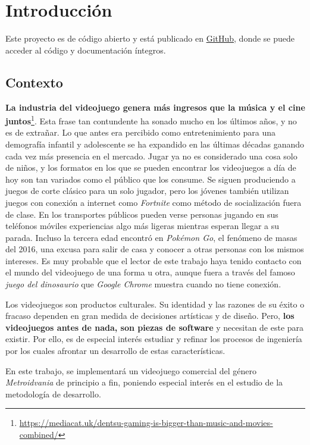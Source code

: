 \chapter{Introducción}

Este proyecto es de código abierto y está publicado en \href{https://github.com/pabloMillanCb/tfm}{GitHub}, donde se puede acceder al código y documentación íntegros.

\section{Contexto}

\textbf{La industria del videojuego genera más ingresos que la música y el cine juntos}\footnote{\url{https://mediacat.uk/dentsu-gaming-is-bigger-than-music-and-movies-combined/}}. Esta frase tan contundente ha sonado mucho en los últimos años, y no es de extrañar. Lo que antes era percibido como entretenimiento para una demografía infantil y adolescente se ha expandido en las últimas décadas ganando cada vez más presencia en el mercado. Jugar ya no es considerado una cosa solo de niños, y los formatos en los que se pueden encontrar los videojuegos a día de hoy son tan variados como el público que los consume. Se siguen produciendo a juegos de corte clásico para un solo jugador, pero los jóvenes también utilizan juegos con conexión a internet como \textit{Fortnite} como método de socialización fuera de clase. En los transportes públicos pueden verse personas jugando en sus teléfonos móviles experiencias algo más ligeras mientras esperan llegar a su parada. Incluso la tercera edad encontró en \textit{Pokémon Go}, el fenómeno de masas del 2016, una excusa para salir de casa y conocer a otras personas con los mismos intereses. Es muy probable que el lector de este trabajo haya tenido contacto con el mundo del videojuego de una forma u otra, aunque fuera a través del famoso \textit{juego del dinosaurio} que \textit{Google Chrome} muestra cuando no tiene conexión. 

Los videojuegos son productos culturales. Su identidad y las razones de su éxito o fracaso dependen en gran medida de decisiones artísticas y de diseño. Pero, \textbf{los videojuegos antes de nada, son piezas de software} y necesitan de este para existir. Por ello, es de especial interés estudiar y refinar los procesos de ingeniería por los cuales afrontar un desarrollo de estas características. 

En este trabajo, se implementará un videojuego comercial del género \textit{Metroidvania} de principio a fin, poniendo especial interés en el estudio de la metodología de desarrollo.

